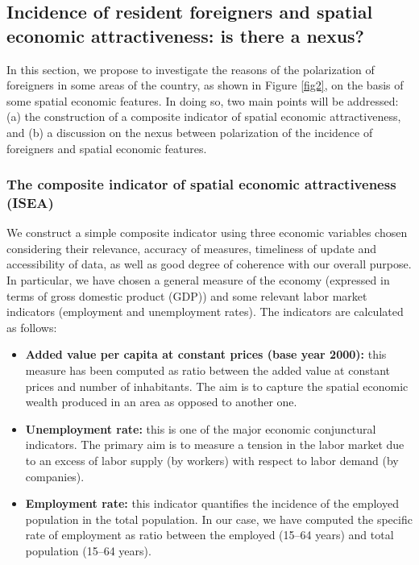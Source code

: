 \documentclass[10pt]{article}
\theoremstyle{definition}
\theoremstyle{plain}
\begin{document}
\subsection{Incidence of resident foreigners and spatial economic attractiveness: is there a nexus? \label{NEX}}

In this section, we propose to investigate the reasons of the polarization of foreigners in some areas of the country, as shown in Figure \ref{fig2}, on the basis of some spatial economic features. In doing so, two main points will be addressed: (a) the construction of a composite indicator of spatial economic attractiveness, and (b) a discussion on the nexus between polarization of the incidence of foreigners and spatial economic features.


\subsubsection{The composite indicator of spatial economic attractiveness (ISEA) \label{ISEA}}

We construct a simple composite indicator using three economic variables chosen considering their relevance, accuracy of measures, timeliness of update and accessibility of data, as well as good degree of coherence with our overall purpose. In particular, we have chosen a general measure of the economy (expressed in terms of gross domestic product (GDP)) and some relevant labor  market indicators (employment and unemployment rates). The indicators are calculated as follows:

\begin{itemize}

\item \textbf{Added value per capita at constant prices (base year 2000):} this measure has been computed as ratio between the added value at constant prices and number of inhabitants. The aim is to capture the spatial economic wealth produced in an area as opposed to another one.

\item \textbf{Unemployment rate:} this is one of the major economic conjunctural indicators. The primary aim is to measure a tension in the labor market due to an excess of labor supply (by workers) with respect to labor demand (by companies).

\item \textbf{Employment rate:} this indicator quantifies the incidence of the employed population in the total population. In our case, we have computed the specific rate of employment as ratio between the employed (15--64 years) and total population (15--64 years). 
	
\end{itemize}
\end{document}
